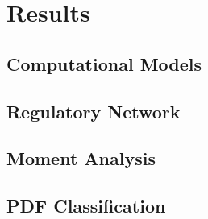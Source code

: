 
\section{Results}


\subsection{Computational Models}


\subsection{Regulatory Network}


\subsection{Moment Analysis}


\subsection{PDF Classification}



